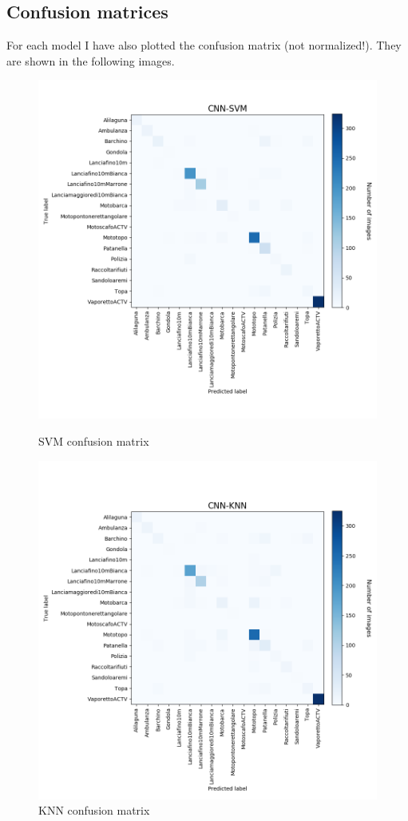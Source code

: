 \documentclass[12pt]{article}
\begin{document}
\subsection{Confusion matrices}
For each model I have also plotted the confusion matrix (not normalized!). They are shown in the following images.

\begin{figure}[!ht]
	\centering
	\begin{minipage}{.5\textwidth}
		\centering
		\includegraphics[width=.8\linewidth]{../code/output/CNN-SVM.png}
		\caption{SVM confusion matrix} %
		\label{fig:cnf_svm}
	\end{minipage}%
	\begin{minipage}{.5\textwidth}
		\centering
		\includegraphics[width=.8\linewidth]{../code/output/CNN-KNN.png}
		\caption{KNN confusion matrix} %
		\label{fig:cnf_knn}
	\end{minipage}
\end{figure}
\end{document}
